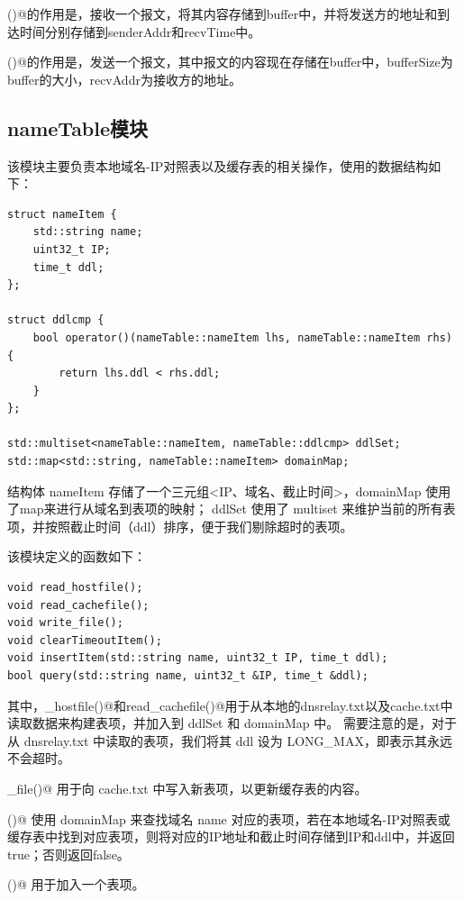 \documentclass[]{article}
\begin{document}
        \verb@recvBuffer()@的作用是，接收一个报文，将其内容存储到buffer中，并将发送方的地址和到达时间分别存储到senderAddr和recvTime中。
        
        \verb@sendBuffer()@的作用是，发送一个报文，其中报文的内容现在存储在buffer中，bufferSize为buffer的大小，recvAddr为接收方的地址。
        
    \subsection{nameTable模块}
        该模块主要负责本地域名-IP对照表以及缓存表的相关操作，使用的数据结构如下：
        \begin{lstlisting}
struct nameItem {
    std::string name;
    uint32_t IP;
    time_t ddl;
};

struct ddlcmp {
    bool operator()(nameTable::nameItem lhs, nameTable::nameItem rhs) {
        return lhs.ddl < rhs.ddl;
    }
};

std::multiset<nameTable::nameItem, nameTable::ddlcmp> ddlSet;
std::map<std::string, nameTable::nameItem> domainMap;
        \end{lstlisting}

        结构体 nameItem 存储了一个三元组<IP、域名、截止时间>，domainMap 使用了map来进行从域名到表项的映射；
        ddlSet 使用了 multiset 来维护当前的所有表项，并按照截止时间（ddl）排序，便于我们剔除超时的表项。

        该模块定义的函数如下：

        \begin{lstlisting}
void read_hostfile();
void read_cachefile();
void write_file();
void clearTimeoutItem();
void insertItem(std::string name, uint32_t IP, time_t ddl);
bool query(std::string name, uint32_t &IP, time_t &ddl);            
        \end{lstlisting}

        其中，\verb@read_hostfile()@和\verb@ read_cachefile()@用于从本地的dnsrelay.txt以及cache.txt中读取数据来构建表项，并加入到 ddlSet 和 domainMap 中。
        需要注意的是，对于从 dnsrelay.txt 中读取的表项，我们将其 ddl 设为 LONG\_MAX，即表示其永远不会超时。
        
        \verb@write_file()@ 用于向 cache.txt 中写入新表项，以更新缓存表的内容。

        \verb@query()@ 使用 domainMap 来查找域名 name 对应的表项，若在本地域名-IP对照表或缓存表中找到对应表项，则将对应的IP地址和截止时间存储到IP和ddl中，并返回true；否则返回false。

        \verb@insertItem()@ 用于加入一个表项。
\end{document}
